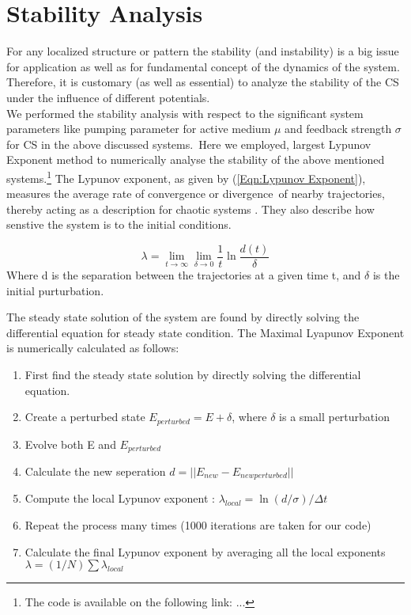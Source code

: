\section{Stability Analysis}
For any localized structure or pattern the stability (and instability) is a big issue for application as well as for fundamental concept of the dynamics of the system. Therefore,  it is customary (as well as essential) to analyze the stability of the CS under the influence of different potentials.\\
We performed the stability analysis with respect to the significant system parameters like pumping parameter for active medium $\mu$ and feedback strength $\sigma$  for CS in the above discussed systems.\
Here we employed, largest Lypunov Exponent method to numerically analyse the stability of the above mentioned systems.\footnote[1]{The code is available on the following link: ...} The Lypunov exponent, as given by (\ref{Eqn:Lypunov Exponent}), measures the average rate of convergence or divergence\ 
of nearby trajectories, thereby acting as a description for chaotic systems \cite{kulikovEquilibriumStatesVariational2017}. They also describe how senstive the system is to the initial conditions.

\begin{equation}
    \lambda = \lim_{t\rightarrow\infty} \lim_{\delta\rightarrow 0} \frac{1}{t} \ln \frac{d(t)}{\delta} \label{Eqn:Lypunov Exponent}
\end{equation}
Where d is the separation between the trajectories at a given time t, and $\delta$ is the initial purturbation.


The steady state solution of the system are found by directly solving the differential equation for steady state condition. 
The Maximal Lyapunov Exponent is numerically calculated as follows:

\begin{enumerate}
    \item First find the steady state solution by directly solving the differential equation.
    \item Create a perturbed state $E_{perturbed} = E + \delta$, where $\delta$ is a small perturbation
    \item Evolve both E and $E_{perturbed}$ 
    \item Calculate the new seperation $d = || E_{new} - E_{new perturbed}||$
    \item Compute the local Lypunov exponent : $ \lambda_{local} = \ln (d/\sigma) /\Delta t $
    \item Repeat the process many times (1000 iterations are taken for our code)
    \item Calculate the final Lypunov exponent by averaging all the local exponents $\lambda = (1/N) \sum \lambda_{local}$
\end{enumerate}

